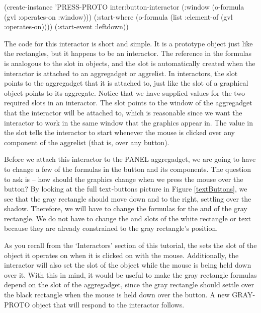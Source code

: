 \begin{programexample}
(create-instance 'PRESS-PROTO inter:button-interactor
   (:window (o-formula (gvl :operates-on :window)))
   (:start-where (o-formula (list :element-of (gvl :operates-on))))
   (:start-event :leftdown))
\end{programexample}

The code for this interactor is short and simple.  It is a
prototype object just like the rectangles, but it happens to be an
interactor.  The  reference in the formulas is
analogous to the  slot in objects, and the slot is
automatically created when the interactor is attached to an
aggregadget or aggrelist.  In interactors, the
 slot points to the aggregadget that it is attached
to, just like the  slot of a graphical object points to
its aggregate.  Notice that we have supplied values for the two
required slots in an interactor.  The  slot points to the
window of the aggregadget that the interactor will be attached to,
which is reasonable since we want the interactor to work in the same
window that the graphics appear in.  The value in the
 slot tells the interactor to start whenever the
mouse is clicked over any component of the aggrelist (that is, over
any button).

Before we attach this interactor to the PANEL aggregadget, we are
going to have to change a few of the formulas in the button and its
components.  The question to ask is -- how should the graphics change
when we press the mouse over the button?  By looking at the full
text-buttons picture in Figure \ref{textButtons}, we see that the
gray rectangle should move down and to the right, settling over the
shadow.  Therefore, we will have to change the formulas for the
 and  of the gray rectangle.  We do not have to
change the  and  slots of the white rectangle or
text because they are already constrained to the gray rectangle's
position.

As you recall from the `Interactors' section of this
tutorial, the  sets the  slot of
the object it operates on when it is clicked on with the mouse.
Additionally, the interactor will also set the 
slot of the object while the mouse is being held down over it.  With
this in mind, it would be useful to make the gray rectangle formulas
depend on the  slot of the aggregadget, since
the gray rectangle should settle over the black rectangle when the
mouse is held down over the button.  A new GRAY-PROTO object that will
respond to the interactor follows.

